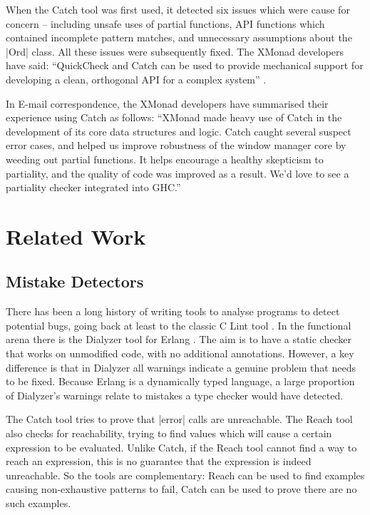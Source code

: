 \documentclass[preprint]{sigplanconf}
\begin{document}
When the Catch tool was first used, it detected six issues which were cause for concern -- including unsafe uses of partial functions, API functions which contained incomplete pattern matches, and unnecessary assumptions about the |Ord| class. All these issues were subsequently fixed. The XMonad developers have said: ``QuickCheck and Catch can be used to provide mechanical support for developing a clean, orthogonal API for a complex system'' \cite{xmonad}.

In E-mail correspondence, the XMonad developers have summarised their experience using Catch as follows: ``XMonad made heavy use of Catch in the development of its core data structures and logic. Catch caught several suspect error cases, and helped us improve robustness of the window manager core by weeding out partial functions. It helps encourage a healthy skepticism to partiality, and the quality of code was improved as a result. We'd love to see a partiality checker integrated into GHC.''

\section{Related Work}
\label{sec:related}

\subsection{Mistake Detectors}

There has been a long history of writing tools to analyse programs to detect potential bugs, going back at least to the classic C Lint tool \cite{lint}. In the functional arena there is the Dialyzer tool \cite{dialyzer} for Erlang \cite{erlang}. The aim is to have a static checker that works on unmodified code, with no additional annotations. However, a key difference is that in Dialyzer all warnings indicate a genuine problem that needs to be fixed. Because Erlang is a dynamically typed language, a large proportion of Dialyzer's warnings relate to mistakes a type checker would have detected.

The Catch tool tries to prove that |error| calls are unreachable. The Reach tool \cite{naylor:reach} also checks for reachability, trying to find values which will cause a certain expression to be evaluated. Unlike Catch, if the Reach tool cannot find a way to reach an expression, this is no guarantee that the expression is indeed unreachable. So the tools are complementary: Reach can be used to find examples causing non-exhaustive patterns to fail, Catch can be used to prove there are no such examples.
\end{document}
